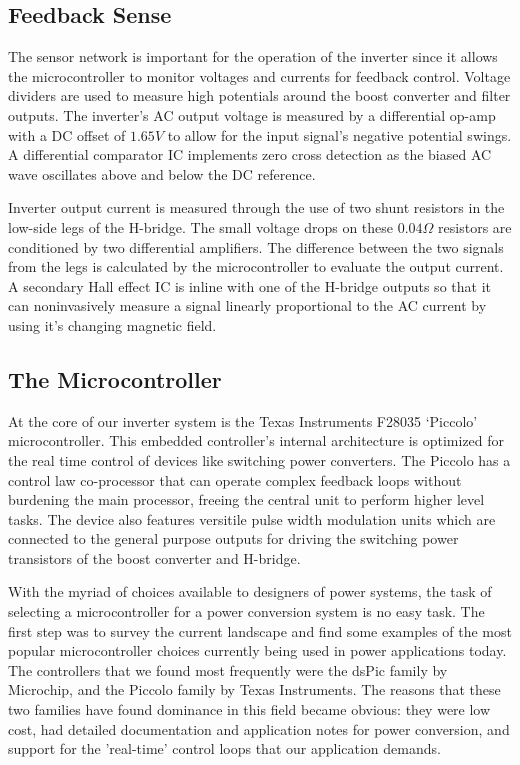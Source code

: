 \subsection{Feedback Sense}
The sensor network is important for the operation of the inverter since it allows the microcontroller to monitor voltages and currents for feedback control. Voltage dividers are used to measure high potentials around the boost converter and filter outputs. The inverter's AC output voltage is measured by a differential op-amp with a DC offset of $1.65V$ to allow for the input signal's negative potential swings. A differential comparator IC implements zero cross detection as the biased AC wave oscillates above and below the DC reference. 

Inverter output current is measured through the use of two shunt resistors in the low-side legs of the H-bridge. The small voltage drops on these $0.04\Omega$ resistors are conditioned by two differential amplifiers. The difference between the two signals from the legs is calculated by the microcontroller to evaluate the output current. A secondary Hall effect IC is inline with one of the H-bridge outputs so that it can noninvasively measure a signal linearly proportional to the AC current by using it's changing magnetic field.

\subsection{The Microcontroller}
At the core of our inverter system is the Texas Instruments F28035 `Piccolo' microcontroller. This embedded controller's internal architecture is optimized for the real time control of devices like switching power converters. The Piccolo has a control law co-processor that can operate complex feedback loops without burdening the main processor, freeing the central unit to perform higher level tasks. The device also features versitile pulse width modulation units which are connected to the general purpose outputs for driving the switching power transistors of the boost converter and H-bridge. 

With the myriad of choices available to designers of power systems, the task of selecting a microcontroller for a power conversion system is no easy task. The first step was to survey the current landscape and find some examples of the most popular microcontroller choices currently being used in power applications today. The controllers that we found most frequently were the dsPic family by Microchip, and the Piccolo family by Texas Instruments. The reasons that these two families have found dominance in this field became obvious: they were low cost, had detailed documentation and application notes for power conversion, and support for the 'real-time' control loops that our application demands.

